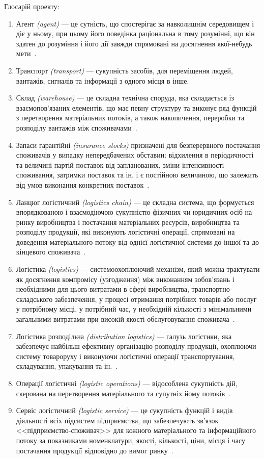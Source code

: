 Глосарій проекту:
\begin{enumerate}
    \item Агент \textit{(agent)} --- це сутність, що спостерігає за навколишнім середовищем і діє у ньому, при цьому його поведінка раціональна в тому розумінні, що він здатен до розуміння і його дії завжди спрямовані на досягнення якої-небудь мети~\cite{Jennings1998}.
    \item Транспорт \textit{(transport)} --- сукупність засобів, для переміщення людей, вантажів, сигналів та інформації з одного місця в інше.
    \item Склад \textit{(warehouse)} --- це складна технічна споруда, яка складається із взаємопов'язаних елементів, що має певну структуру та виконує ряд функцій з перетворення матеріальних потоків, а також накопичення, переробки та розподілу вантажів між споживачами~\cite{Kusluy2010}. 
	\item Запаси гарантійні \textit{(insurance stocks)} призначені для безперервного постачання споживачів у випадку непередбачених обставин: відхилення в періодичності та величині партій поставок від запланованих, зміни інтенсивності споживання, затримки поставок та ін. і є постійною величиною, що залежить від умов виконання конкретних поставок~\cite{Kusluy2010}. 
	\item Ланцюг логістичний \textit{(logistics chain)}  --- це складна система, що формується впорядкованою і взаємодіючою сукупністю фізичних чи юридичних осіб на ринку виробництва і постачання матеріальних ресурсів, виробництва та розподілу продукції, які виконують логістичні операції, спрямовані на доведення матеріального потоку від однієї логістичної системи до іншої та до кінцевого споживача~\cite{Kusluy2010}.  
    \item Логістика \textit{(logistics)} --- системоохоплюючий механізм, який можна трактувати як досягнення компромісу (узгодження) між виконанням зобов’язань і необхідними для цього витратами в сфері виробництва, транспортно-складського забезпечення, у процесі отримання потрібних товарів або послуг у потрібному місці, у потрібний час, у необхідній кількості з мінімальними загальними витратами при високій якості обслуговування споживача~\cite{Kusluy2010}.
	\item Логістика розподільча \textit{(distribution logistics)} --- галузь логістики, яка забезпечує найбільш ефективну організацію розподілу продукції, охоплюючи систему товароруху і виконуючи логістичні операції транспортування, складування, упакування та ін.~\cite{Kusluy2010}.
    \item Операції логістичні \textit{(logistic operations)} --- відособлена сукупність дій, скерована на перетворення матеріального та супутніх йому потоків~\cite{Kusluy2010}.
    \item Сервіс логістичний \textit{(logistic service)} --- це сукупність функцій і видів діяльності всіх підсистем підприємства, що забезпечують зв’язок <<підприємство-споживач>> для кожного матеріального та інформаційного потоку за показниками номенклатури, якості, кількості, ціни, місця і часу постачання продукції відповідно до вимог ринку~\cite{Kusluy2010}.
\end{enumerate}

